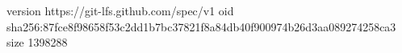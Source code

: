 version https://git-lfs.github.com/spec/v1
oid sha256:87fce8f98658f53c2dd1b7bc37821f8a84db40f900974b26d3aa089274258ca3
size 1398288
